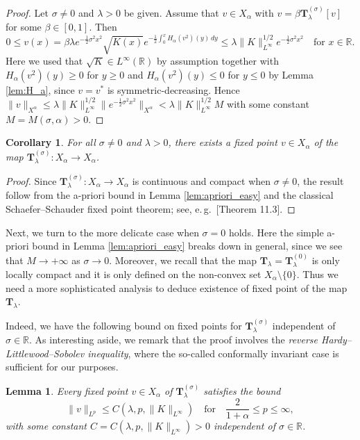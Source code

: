 \documentclass[reqno,10pt,a4paper]{amsart}
\newtheorem{lem}{Lemma}[section]
\newtheorem{cor}{Corollary}[section]
\theoremstyle{definition}
\theoremstyle{definition}
\theoremstyle{remark}
\theoremstyle{remark}
\numberwithin{equation}{section}
\newcommand{\R}{\mathbb{R}}
\newcommand{\Ts}{\mathbf{T}}
\newcommand{\Tss}{\mathbf{T}^{(\sigma)}_\lambda}
\begin{document}
\begin{proof}
Let $\sigma \neq 0$ and $\lambda > 0$ be given. Assume that $v \in X_\alpha$ with $v = \beta \Tss[v]$ for some $\beta \in [0,1]$. Then
$$
0 \leq v(x) = \beta \lambda e^{-\frac{1}{2} \sigma^2 x^2} \sqrt{K(x)} e^{-\frac{1}{2} \int_0^x H_\alpha(v^2)(y) \, dy} \leq \lambda  \|K \|_{L^\infty}^{1/2} e^{-\frac{1}{2} \sigma^2 x^2} \quad \mbox{for $x \in \R$}.
$$
Here we used that  $\sqrt{K} \in L^\infty(\R)$ by assumption together with $H_\alpha(v^2)(y)\geq 0$ for $y \geq 0$ and $H_\alpha(v^2)(y) \leq 0$ for $y \leq 0$ by Lemma \ref{lem:H_a}, since $v=v^*$ is symmetric-decreasing. Hence $\| v \|_{X^\alpha} \leq \lambda \|K \|_{L^\infty}^{1/2} \| e^{-\frac{1}{2} \sigma^2 x^2} \|_{X^\alpha} < \lambda \|K \|_{L^\infty}^{1/2} M$ with some constant $M= M(\sigma, \alpha) > 0$.
\end{proof}

\begin{cor} \label{cor:existence_fixedpoints}
For all $\sigma \neq 0$ and $\lambda > 0$, there exists a fixed point $v \in X_\alpha$ of the map $\Tss : X_\alpha \to X_\alpha$.
\end{cor}

\begin{proof}
Since $\Tss : X_\alpha \to X_\alpha$ is continuous and compact when $\sigma \neq 0$, the result follow from the a-priori bound in Lemma \ref{lem:apriori_easy} and the classical Schaefer--Schauder fixed point theorem; see, e.\,g.~\cite{GiTr-01}[Theorem 11.3].
\end{proof}

Next, we turn to the more delicate case when $\sigma=0$ holds. Here the simple a-priori bound in Lemma \ref{lem:apriori_easy} breaks down in general, since we see that $M \to +\infty$ as $\sigma \to 0$. Moreover, we recall that the map $\Ts_{\lambda} = \Ts_\lambda^{(0)}$ is only locally compact and it is only defined on the non-convex set $X_\alpha \setminus \{ 0 \}$. Thus we need a more sophisticated analysis to deduce existence of fixed point of the map $\Ts_{\lambda}$.

Indeed, we have the following bound on fixed points for $\Tss$ independent of $\sigma \in \R$. As interesting aside, we remark that the proof involves  the {\em reverse Hardy--Littlewood--Sobolev inequality}, where the so-called conformally invariant case is sufficient for our purposes.

\begin{lem} \label{lem:HLS}
Every fixed point $v \in X_\alpha$ of $\Tss$ satisfies the bound
$$
\| v \|_{L^p} \leq C(\lambda, p, \| K \|_{L^\infty}) \quad \mbox{for} \quad \mbox{$\frac{2}{1+ \alpha} \leq p \leq \infty$},
$$
with some constant $C=C(\lambda,p,\| K \|_{L^\infty}) > 0$ independent of $\sigma \in \R$.
\end{lem}
\end{document}

